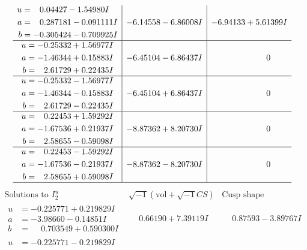 \documentclass[1p]{elsarticle_modified}
\theoremstyle{definition}
\newcommand{\I}{\sqrt{-1}}
\begin{document}
$$\begin{array}{c|c|c}
\begin{aligned}
u &= \phantom{-}0.04427 - 1.54980 I \\
a &= \phantom{-}0.287181 - 0.091111 I \\
b &= -0.305424 - 0.709925 I\end{aligned}
 & -6.14558 - 6.86008 I & -6.94133 + 5.61399 I \\ \hline\begin{aligned}
u &= -0.25332 + 1.56977 I \\
a &= -1.46344 + 0.15883 I \\
b &= \phantom{-}2.61729 + 0.22435 I\end{aligned}
 & -6.45104 - 6.86437 I & \phantom{-0.000000 } 0 \\ \hline\begin{aligned}
u &= -0.25332 - 1.56977 I \\
a &= -1.46344 - 0.15883 I \\
b &= \phantom{-}2.61729 - 0.22435 I\end{aligned}
 & -6.45104 + 6.86437 I & \phantom{-0.000000 } 0 \\ \hline\begin{aligned}
u &= \phantom{-}0.22453 + 1.59292 I \\
a &= -1.67536 + 0.21937 I \\
b &= \phantom{-}2.58655 - 0.59098 I\end{aligned}
 & -8.87362 + 8.20730 I & \phantom{-0.000000 } 0 \\ \hline\begin{aligned}
u &= \phantom{-}0.22453 - 1.59292 I \\
a &= -1.67536 - 0.21937 I \\
b &= \phantom{-}2.58655 + 0.59098 I\end{aligned}
 & -8.87362 - 8.20730 I & \phantom{-0.000000 } 0\\
 \hline 
 \end{array}$$\newpage$$\begin{array}{c|c|c}  
\text{Solutions to }I^u_{2}& \I (\text{vol} + \sqrt{-1}CS) & \text{Cusp shape}\\
 \hline 
\begin{aligned}
u &= -0.225771 + 0.219829 I \\
a &= -3.98660 - 0.14851 I \\
b &= \phantom{-}0.703549 + 0.590300 I\end{aligned}
 & \phantom{-}0.66190 + 7.39119 I & \phantom{-}0.87593 - 3.89767 I \\ \hline\begin{aligned}
u &= -0.225771 - 0.219829 I \\

\end{aligned}
\end{array}$$
\end{document}
